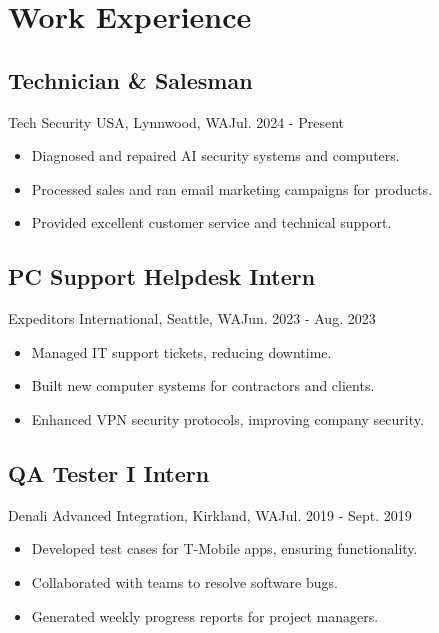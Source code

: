 \section{Work Experience}
\subsection{Technician \& Salesman}{Tech Security USA, Lynnwood, WA}{Jul. 2024 - Present}
\begin{itemize}
    \item Diagnosed and repaired AI security systems and computers.
    \item Processed sales and ran email marketing campaigns for products.
    \item Provided excellent customer service and technical support.
\end{itemize}
\subsection{PC Support Helpdesk Intern}{Expeditors International, Seattle, WA}{Jun. 2023 - Aug. 2023}
\begin{itemize}
    \item Managed IT support tickets, reducing downtime.
    \item Built new computer systems for contractors and clients.
    \item Enhanced VPN security protocols, improving company security.
\end{itemize}
\subsection{QA Tester I Intern}{Denali Advanced Integration, Kirkland, WA}{Jul. 2019 - Sept. 2019}
\begin{itemize}
    \item Developed test cases for T-Mobile apps, ensuring functionality.
    \item Collaborated with teams to resolve software bugs.
    \item Generated weekly progress reports for project managers.
\end{itemize}